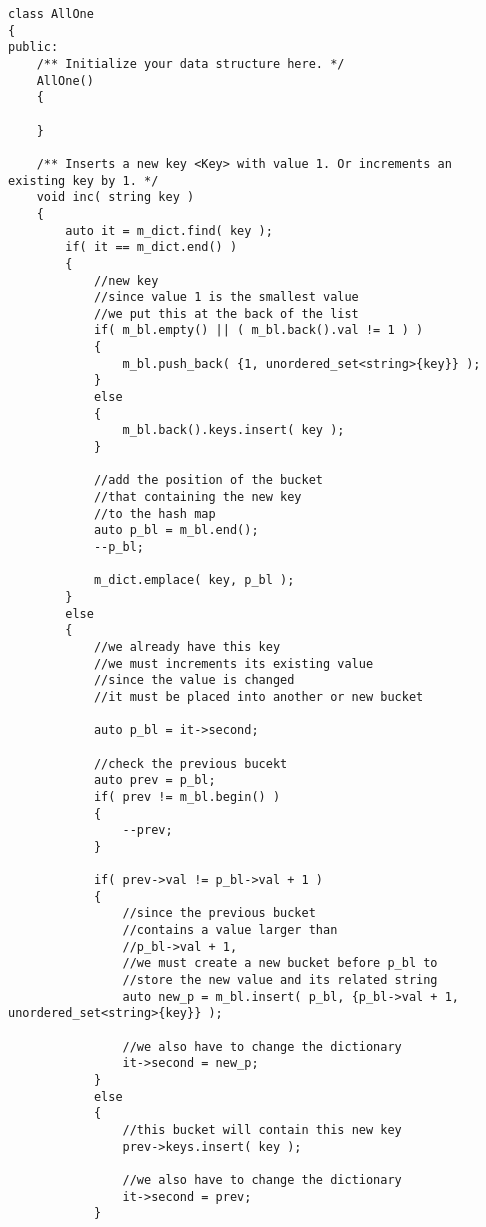 \setcounter{lstlisting}{0}
\begin{lstlisting}[style=customc, caption={Double Linked List and Iterator For Value In Hash Map}]
class AllOne
{
public:
    /** Initialize your data structure here. */
    AllOne()
    {

    }

    /** Inserts a new key <Key> with value 1. Or increments an existing key by 1. */
    void inc( string key )
    {
        auto it = m_dict.find( key );
        if( it == m_dict.end() )
        {
            //new key
            //since value 1 is the smallest value
            //we put this at the back of the list
            if( m_bl.empty() || ( m_bl.back().val != 1 ) )
            {
                m_bl.push_back( {1, unordered_set<string>{key}} );
            }
            else
            {
                m_bl.back().keys.insert( key );
            }

            //add the position of the bucket
            //that containing the new key
            //to the hash map
            auto p_bl = m_bl.end();
            --p_bl;

            m_dict.emplace( key, p_bl );
        }
        else
        {
            //we already have this key
            //we must increments its existing value
            //since the value is changed
            //it must be placed into another or new bucket

            auto p_bl = it->second;

            //check the previous bucekt
            auto prev = p_bl;
            if( prev != m_bl.begin() )
            {
                --prev;
            }

            if( prev->val != p_bl->val + 1 )
            {
                //since the previous bucket
                //contains a value larger than
                //p_bl->val + 1,
                //we must create a new bucket before p_bl to
                //store the new value and its related string
                auto new_p = m_bl.insert( p_bl, {p_bl->val + 1, unordered_set<string>{key}} );

                //we also have to change the dictionary
                it->second = new_p;
            }
            else
            {
                //this bucket will contain this new key
                prev->keys.insert( key );

                //we also have to change the dictionary
                it->second = prev;
            }


\end{lstlisting}
